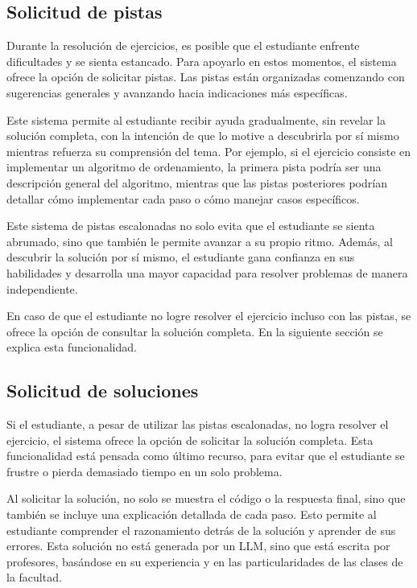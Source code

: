 \documentclass{article}
\begin{document}
\subsection{Solicitud de pistas}

Durante la resolución de ejercicios, es posible que el estudiante enfrente dificultades y se sienta estancado. Para apoyarlo en estos momentos, el sistema ofrece la opción de solicitar pistas. Las pistas están organizadas comenzando con sugerencias generales y avanzando hacia indicaciones más específicas. 

Este sistema permite al estudiante recibir ayuda gradualmente, sin revelar la solución completa, con la intención de que lo motive a descubrirla por sí mismo mientras refuerza su comprensión del tema. Por ejemplo, si el ejercicio consiste en implementar un algoritmo de ordenamiento, la primera pista podría ser una descripción general del algoritmo, mientras que las pistas posteriores podrían detallar cómo implementar cada paso o cómo manejar casos específicos.

Este sistema de pistas escalonadas no solo evita que el estudiante se sienta abrumado, sino que también le permite avanzar a su propio ritmo. Además, al descubrir la solución por sí mismo, el estudiante gana confianza en sus habilidades y desarrolla una mayor capacidad para resolver problemas de manera independiente.

En caso de que el estudiante no logre resolver el ejercicio incluso con las pistas, se ofrece la opción de consultar la solución completa. En la siguiente sección se explica esta funcionalidad.

\subsection{Solicitud de soluciones}

Si el estudiante, a pesar de utilizar las pistas escalonadas, no logra resolver el ejercicio, el sistema ofrece la opción de solicitar la solución completa. Esta funcionalidad está pensada como último recurso, para evitar que el estudiante se frustre o pierda demasiado tiempo en un solo problema.

Al solicitar la solución, no solo se muestra el código o la respuesta final, sino que también se incluye una explicación detallada de cada paso. Esto permite al estudiante comprender el razonamiento detrás de la solución y aprender de sus errores. Esta solución no está generada por un LLM, sino que está escrita por profesores, basándose en su experiencia y en las particularidades de las clases de la facultad.
\end{document}
